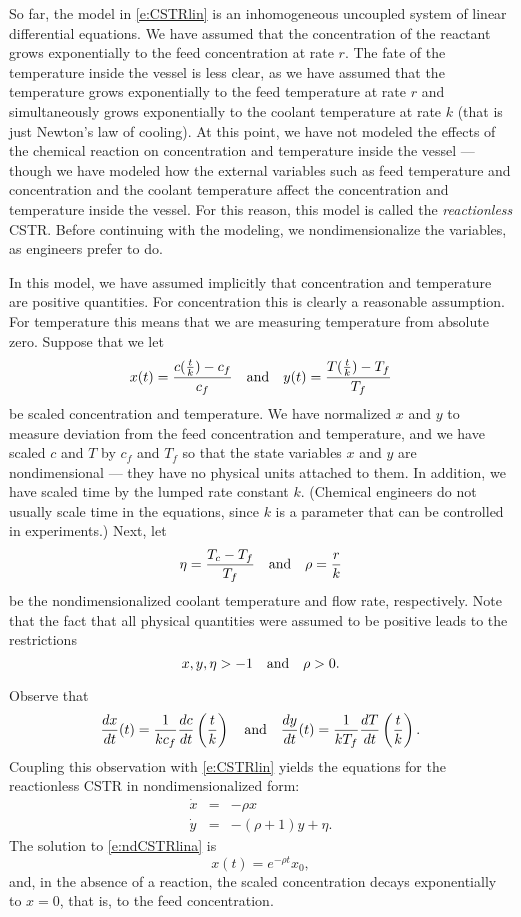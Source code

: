 \documentclass{ximera}
\begin{document}
So far, the model in \eqref{e:CSTRlin} is an inhomogeneous uncoupled system
of linear differential equations.  We have assumed that the concentration 
of the reactant grows exponentially to the feed concentration at rate
$r$.  The fate of the temperature inside the vessel is less
clear, as we have assumed that the temperature grows exponentially to 
the feed temperature at rate $r$ and simultaneously grows
exponentially to the coolant temperature at rate $k$ (that is
just Newton's law of cooling).  
At this point, we have not modeled the effects of the chemical reaction 
on concentration and temperature inside the vessel --- though we have modeled 
how the external variables such as feed temperature and concentration and 
the coolant temperature affect the concentration and temperature inside the 
vessel.  For this reason, this model is called the {\em reactionless\/} CSTR. 
Before continuing with the modeling, we 
nondimensionalize the variables, as 
engineers prefer to do.

In this model, we have assumed implicitly that concentration and
temperature are positive quantities.  For concentration this is
clearly a reasonable assumption.  For temperature this means
that we are measuring temperature from absolute zero.  Suppose
that we let  
\[
x(t) = \frac{c(\frac{t}{k})-c_f}{c_f} \quad\mbox{and}\quad 
y(t) = \frac{T(\frac{t}{k})-T_f}{T_f}
\]
be scaled concentration and temperature.  We have normalized $x$
and $y$ to measure deviation from the feed concentration and
temperature, and we have scaled $c$ and $T$ by $c_f$ and $T_f$
so that the state variables $x$ and $y$ are nondimensional ---
they have no physical units attached to them.  In addition, we
have scaled time by the lumped rate constant $k$.  (Chemical engineers
do not usually scale time in the equations, since $k$ is a 
parameter that can be controlled in experiments.) Next, let 
\[
\eta = \frac{T_c-T_f}{T_f} \quad\mbox{and}\quad \rho = \frac{r}{k}
\]
be the nondimensionalized coolant temperature and flow rate,
respectively.  Note that the fact that all physical quantities
were assumed to be positive leads to the restrictions
\[
x, y,\eta >-1  \quad\mbox{and}\quad \rho>0.
\]

Observe that 
\[
\frac{dx}{dt}(t)=\frac{1}{kc_f}\frac{dc}{dt}\left(\frac{t}{k}\right) \quad\mbox{and}\quad
\frac{dy}{dt}(t)=\frac{1}{kT_f}\frac{dT}{dt}\left(\frac{t}{k}\right).
\]
Coupling this observation with \eqref{e:CSTRlin} yields the equations 
for the reactionless CSTR in nondimensionalized form:
\begin{eqnarray}
\dot{x} & = & -\rho x \label{e:ndCSTRlina} \\
\dot{y} & = & -(\rho+1)y + \eta. \label{e:ndCSTRlinb}
\end{eqnarray}
The solution to \eqref{e:ndCSTRlina} is 
\[
x(t) = e^{-\rho t}x_0,
\]
and, in the absence of a reaction, the scaled concentration
decays exponentially to $x=0$, that is, to the feed
concentration.
\end{document}
